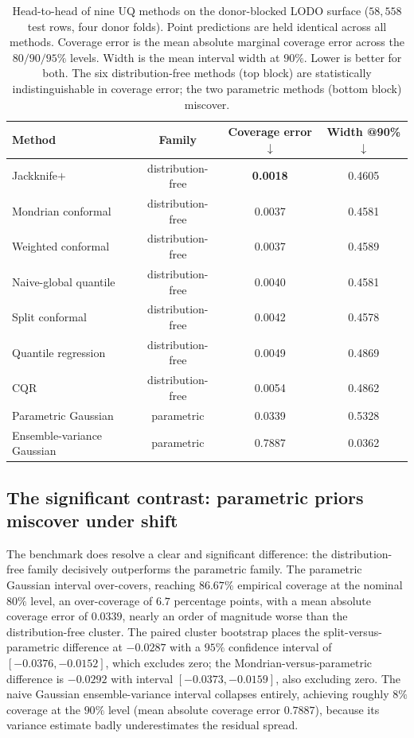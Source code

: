 \documentclass{article}
\begin{document}
\begin{table}[t]
\centering
\caption{Head-to-head of nine UQ methods on the donor-blocked LODO
surface ($58{,}558$ test rows, four donor folds). Point predictions are
held identical across all methods. Coverage error is the mean absolute
marginal coverage error across the $80/90/95\%$ levels. Width is the mean
interval width at $90\%$. Lower is better for both. The six
distribution-free methods (top block) are statistically indistinguishable
in coverage error; the two parametric methods (bottom block) miscover.}
\label{tab:main}
\begin{tabular}{lccc}
\toprule
Method & Family & Coverage error $\downarrow$ & Width @90\% $\downarrow$ \\
\midrule
Jackknife$+$          & distribution-free & \textbf{0.0018} & 0.4605 \\
Mondrian conformal    & distribution-free & 0.0037 & 0.4581 \\
Weighted conformal    & distribution-free & 0.0037 & 0.4589 \\
Naive-global quantile & distribution-free & 0.0040 & 0.4581 \\
Split conformal       & distribution-free & 0.0042 & 0.4578 \\
Quantile regression   & distribution-free & 0.0049 & 0.4869 \\
CQR                   & distribution-free & 0.0054 & 0.4862 \\
\midrule
Parametric Gaussian   & parametric        & 0.0339 & 0.5328 \\
Ensemble-variance Gaussian & parametric   & 0.7887 & 0.0362 \\
\bottomrule
\end{tabular}
\end{table}

\subsection{The significant contrast: parametric priors miscover under shift}

The benchmark does resolve a clear and significant difference: the
distribution-free family decisively outperforms the parametric family.
The parametric Gaussian interval over-covers, reaching $86.67\%$
empirical coverage at the nominal $80\%$ level, an over-coverage of $6.7$
percentage points, with a mean absolute coverage error of $0.0339$,
nearly an order of magnitude worse than the distribution-free cluster.
The paired cluster bootstrap places the split-versus-parametric
difference at $-0.0287$ with a $95\%$ confidence interval of
$[-0.0376, -0.0152]$, which excludes zero; the Mondrian-versus-parametric
difference is $-0.0292$ with interval $[-0.0373, -0.0159]$, also
excluding zero. The naive Gaussian ensemble-variance interval collapses
entirely, achieving roughly $8\%$ coverage at the $90\%$ level (mean
absolute coverage error $0.7887$), because its variance estimate badly
underestimates the residual spread.
\end{document}
